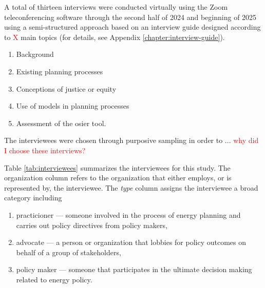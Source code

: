 A total of thirteen interviews were conducted virtually using the Zoom
teleconferencing software through the second half of 2024 and beginning of 2025
using a semi-structured approach based on an interview guide designed according
to \textcolor{red}{X} main topics (for details, see Appendix
\ref{chapter:interview-guide}).
\begin{enumerate}
    \item Background
    \item Existing planning processes
    \item Conceptions of justice or equity
    \item Use of models in planning processes
    \item Assessment of the \ac{osier} tool.
\end{enumerate}
The interviewees were chosen through purposive sampling in order to ... 
\textcolor{red}{why did I choose these interviews?}

Table \ref{tab:interviewees} summarizes the interviewees for this study. The
organization column refers to the organization that either employs, or is
represented by, the interviewee. The \textit{type} column assigns the
interviewee a broad category including
\begin{enumerate}
    \item practicioner --- someone involved in the process of energy planning
    and carries out policy directives from policy makers,
    \item advocate --- a person or organization that lobbies for policy outcomes
    on behalf of a group of stakeholders,
    \item policy maker --- someone that participates in the ultimate decision
    making related to energy policy.
\end{enumerate}
    
